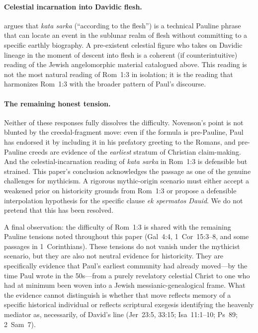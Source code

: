 \documentclass[12pt,oneside]{article}
\newcommand{\grk}[1]{\textit{#1}}   %
\begin{document}
\paragraph{Celestial incarnation into Davidic flesh.}
\citet{Carrier2014} argues that \grk{kata sarka} (\enquote{according to
the flesh}) is a technical Pauline phrase that can locate an event in
the sublunar realm of flesh without committing to a specific earthly
biography.  A pre-existent celestial figure who takes on Davidic
lineage in the moment of descent into flesh is a coherent (if
counterintuitive) reading of the Jewish angelomorphic material catalogued
above.  This reading is not the most natural reading of Rom~1:3 in
isolation; it is the reading that harmonizes Rom~1:3 with the broader
pattern of Paul's discourse.

\paragraph{The remaining honest tension.}
Neither of these responses fully dissolves the difficulty.  Novenson's
point is not blunted by the creedal-fragment move: even if the formula
is pre-Pauline, Paul has endorsed it by including it in his prefatory
greeting to the Romans, and pre-Pauline creeds are evidence of the
\textit{earliest} stratum of Christian claim-making.  And the
celestial-incarnation reading of \grk{kata sarka} in Rom~1:3 is
defensible but strained.  This paper's conclusion acknowledges the
passage as one of the genuine challenges for mythicism.  A rigorous
mythic-origin scenario must either accept a weakened prior on
historicity grounds from Rom~1:3 or propose a defensible interpolation
hypothesis for the specific clause \grk{ek spermatos Dauid}.  We do
not pretend that this has been resolved.

A final observation: the difficulty of Rom~1:3 is shared with the
remaining Pauline tensions noted throughout this paper (Gal~4:4,
1~Cor~15:3--8, and some passages in 1~Corinthians).  These tensions
do not vanish under the mythicist scenario, but they are also not
neutral evidence for historicity.  They are specifically evidence that
Paul's earliest community had already moved---by the time Paul wrote in
the 50s---from a purely revelatory celestial Christ to one who had at
minimum been woven into a Jewish messianic-genealogical frame.  What
the evidence cannot distinguish is whether that move reflects
memory of a specific historical individual or reflects scriptural
exegesis identifying the heavenly mediator as, necessarily, of David's
line (Jer~23:5, 33:15; Isa~11:1--10; Ps~89; 2~Sam~7).
\end{document}
